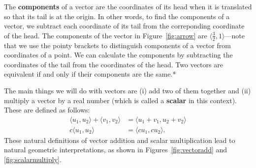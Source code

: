 \documentclass[svgnames]{watsonbook}
\begin{document}
The \textbf{components} of a vector are the coordinates of its head
when it is translated so that its tail is at the origin. In other words,
to find the components of a vector, we subtract each coordinate of its
tail from the correponding coordinate of the head. The components
of the vector in Figure~\ref{fig:arrow} are $\langle \frac{3}{2} ,
1\rangle$---note that we use the pointy brackets to distinguish
components of a vector from coordinates of a point. We can calculate
the components by subtracting the coordinates of the tail from the
coordinates of the head. Two vectors are
equivalent if and only if their components are the same.*

The main things we will do with vectors are (i) add two of them
together and (ii) multiply a vector by a real number (which is called
a \textbf{scalar} in this context). These are
defined as follows:  
\begin{align*}
  \langle u_1, u_2 \rangle  +   \langle v_1, v_2 \rangle &= 
          \langle u_1  + v_1, u_2 + v_2\rangle \\
  c \langle u_1, u_2 \rangle &= \langle cu_1, cu_2 \rangle. 
\end{align*}
These natural definitions of vector addition and scalar multiplication
lead to natural geometric interpretations, as shown in
Figures~\ref{fig:vectoradd} and \ref{fig:scalarmultiply}. 
\end{document}
